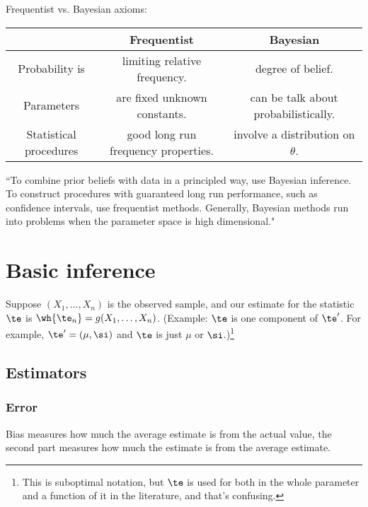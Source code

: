 Frequentist vs. Bayesian axioms:

\noindent
\begin{tabular}{|c|c|c|}
\hline 
 & Frequentist & Bayesian\tabularnewline
\hline 
Probability is  & limiting relative frequency. & degree of belief.\tabularnewline
\hline 
Parameters  & are fixed unknown constants. & can be talk about probabilistically.\tabularnewline
\hline 
Statistical procedures & good long run frequency properties. & involve a distribution on $\theta$.\tabularnewline
\hline 
\end{tabular}

``To combine prior beliefs with data in a principled way, use Bayesian inference.
To construct procedures with guaranteed long run performance, such
as confidence intervals, use frequentist methods. Generally, Bayesian methods
run into problems when the parameter space is high dimensional."

\section{Basic inference}
Suppose $(X_1,\ldots, X_n)$ is the observed sample, and our estimate for the statistic $\te$ is $\wh{\te_n}=g(X_1,\ldots, X_n)$. (Example: $\te$ is one component of $\te'$. For example, $\te'=(\mu,\si)$ and $\te$ is just $\mu$ or $\si$.)\footnote{This is suboptimal notation, but $\te$ is used for both in the whole parameter and a function of it in the literature, and that's confusing.}


\subsection{Estimators}



\subsubsection{Error}

Bias measures how much the average estimate is from the actual value, the second part measures how much the estimate is from the average estimate.

